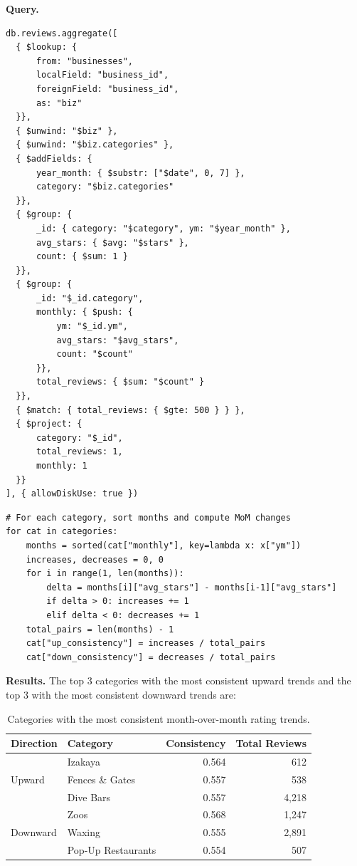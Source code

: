 \documentclass[11pt]{article}
\begin{document}
\textbf{Query.}
\begin{lstlisting}[style=mongo, caption={MongoDB aggregation pipeline for month-over-month trends.}, label={lst:q2-mom}]
db.reviews.aggregate([
  { $lookup: {
      from: "businesses",
      localField: "business_id",
      foreignField: "business_id",
      as: "biz"
  }},
  { $unwind: "$biz" },
  { $unwind: "$biz.categories" },
  { $addFields: {
      year_month: { $substr: ["$date", 0, 7] },
      category: "$biz.categories"
  }},
  { $group: {
      _id: { category: "$category", ym: "$year_month" },
      avg_stars: { $avg: "$stars" },
      count: { $sum: 1 }
  }},
  { $group: {
      _id: "$_id.category",
      monthly: { $push: {
          ym: "$_id.ym",
          avg_stars: "$avg_stars",
          count: "$count"
      }},
      total_reviews: { $sum: "$count" }
  }},
  { $match: { total_reviews: { $gte: 500 } } },
  { $project: {
      category: "$_id",
      total_reviews: 1,
      monthly: 1
  }}
], { allowDiskUse: true })
\end{lstlisting}

\begin{lstlisting}[style=python, caption={Python post-processing for trend consistency.}, label={lst:q2-trend}]
# For each category, sort months and compute MoM changes
for cat in categories:
    months = sorted(cat["monthly"], key=lambda x: x["ym"])
    increases, decreases = 0, 0
    for i in range(1, len(months)):
        delta = months[i]["avg_stars"] - months[i-1]["avg_stars"]
        if delta > 0: increases += 1
        elif delta < 0: decreases += 1
    total_pairs = len(months) - 1
    cat["up_consistency"] = increases / total_pairs
    cat["down_consistency"] = decreases / total_pairs
\end{lstlisting}

\textbf{Results.} The top 3 categories with the most consistent upward trends and the top 3 with the most consistent downward trends are:

\begin{table}[H]
\centering
\small
\caption{Categories with the most consistent month-over-month rating trends.}
\label{tab:q2-trends}
\begin{tabular}{l l r r}
\toprule
\rowcolor{SoftGray}
\textbf{Direction} & \textbf{Category} & \textbf{Consistency} & \textbf{Total Reviews} \\
\midrule
\multirow{3}{*}{Upward} & Izakaya & 0.564 & 612 \\
 & Fences \& Gates & 0.557 & 538 \\
 & Dive Bars & 0.557 & 4,218 \\
\midrule
\multirow{3}{*}{Downward} & Zoos & 0.568 & 1,247 \\
 & Waxing & 0.555 & 2,891 \\
 & Pop-Up Restaurants & 0.554 & 507 \\
\bottomrule
\end{tabular}
\end{table}
\end{document}
